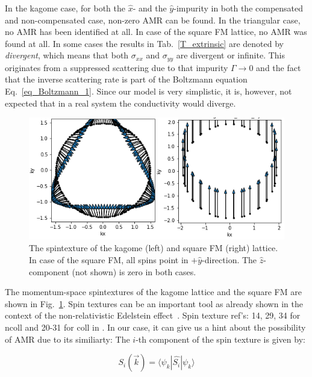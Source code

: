 \documentclass[prb,showpacs,amsmath,amssymb,superscriptaddress,twocolumn,floatfix]{revtex4-1}
\begin{document}
In the kagome case, for both the $\hat{x}$- and the $\hat{y}$-impurity in both the compensated and non-compensated case, non-zero AMR can be found. In the triangular case, no AMR has been identified at all. In case of the square FM lattice, no AMR was found at all. In some cases the results in Tab.~\ref{T_extrinsic} are denoted by \textit{divergent}, which means that both $\sigma_{xx}$ and $\sigma_{yy}$ are divergent or infinite. This originates from a suppressed scattering due to that impurity $\Gamma \rightarrow 0$ and the fact that the inverse scattering rate is part of the Boltzmann equation Eq.~\ref{eq_Boltzmann_1}. Since our model is very simplistic, it is, however, not expected that in a real system the conductivity would diverge.

\begin{figure}
	\centering
	\includegraphics[width=1\linewidth]{img/Combined_Spintexture}
	\caption{The spintexture of the kagome (left) and square FM (right) lattice. In case of the square FM, all spins point in $+\hat{y}$-direction. The $\hat{z}$-component (not shown) is zero in both cases.}
	\label{fig:combinedspintexture}
\end{figure}

The momentum-space spintextures of the kagome lattice and the square FM are shown in Fig.~\ref{fig:combinedspintexture}. Spin textures can be an important tool as already shown in the context of the non-relativistic Edelstein effect~\cite{Gonzalez-Hernandez:2024}. {\color{red} Spin texture ref's: 14, 29, 34 for ncoll and 20-31 for coll in \cite{Gonzalez-Hernandez:2024}}. In our case, it can give us a hint about the possibility of AMR due to its similiarty: The $i$-th component of the spin texture is given by:

\begin{equation}
	S_i (\vec{k}) = \langle \psi_k | \hat{S_i} | \psi_k \rangle
\label{eq_spintexture}
\end{equation}
\end{document}
